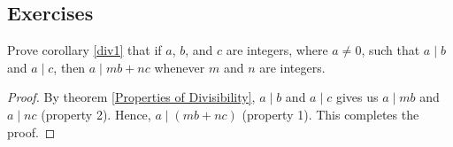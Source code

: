         



    \subsection{Exercises}
    \begin{exercise}
        Prove corollary \ref{div1} that if $a$, $b$, and $c$ are integers, where $a\neq 0$, such that $a\mid b$ and $a\mid c$, then $a\mid mb + nc$ whenever $m$ and $n$ are integers.
    \end{exercise}
    \begin{proof}
        By theorem \ref{Properties of Divisibility}, $a\mid b$ and $a\mid c$ gives us $a\mid mb$
        and $a\mid nc$ (property 2). Hence, $a\mid (mb+nc)$ (property 1). This completes the proof.
    \end{proof}

